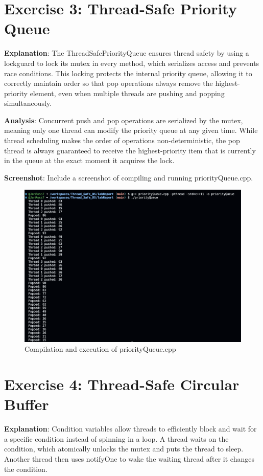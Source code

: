 \documentclass[a4paper]{article}
\begin{document}
\section{Exercise 3: Thread-Safe Priority Queue}

\textbf{Explanation}: The ThreadSafePriorityQueue ensures thread safety by using a lockguard to lock its mutex in every method, which serializes access and prevents race conditions. This locking protects the internal priority queue, allowing it to correctly maintain order so that pop operations always remove the highest-priority element, even when multiple threads are pushing and popping simultaneously.

\textbf{Analysis}: Concurrent push and pop operations are serialized by the mutex, meaning only one thread can modify the priority queue at any given time. While thread scheduling makes the order of operations non-deterministic, the pop thread is always guaranteed to receive the highest-priority item that is currently in the queue at the exact moment it acquires the lock.

\textbf{Screenshot}: Include a screenshot of compiling and running priorityQueue.cpp.
\begin{figure}[H]
    \centering
    \includegraphics[width=\textwidth]{exercise3.png}
    \caption{Compilation and execution of priorityQueue.cpp}
\end{figure}

\section{Exercise 4: Thread-Safe Circular Buffer}

\textbf{Explanation}: Condition variables allow threads to efficiently block and wait for a specific condition instead of spinning in a loop. A thread waits on the condition, which atomically unlocks the mutex and puts the thread to sleep. Another thread then uses notifyOne to wake the waiting thread after it changes the condition.
\end{document}
